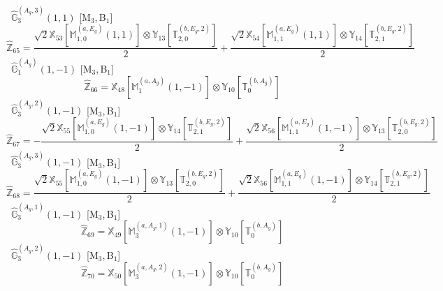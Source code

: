 \documentclass[fleqn,10pt,landscape]{article}
\begin{document}
\begin{itemize}
\begin{dmath*}
\end{dmath*}
\vspace{4mm}
\noindent {} $\,\,\,\hat{\mathbb{G}}_{3}^{(A_{g},3)}(1,1)$ [M$_{3}$,\,B$_{1}$]
\begin{dmath*}
\hat{\mathbb{Z}}_{65}=\frac{\sqrt{2} \mathbb{X}_{53}[\mathbb{M}_{1,0}^{(a,E_{g})}(1,1)] \otimes\mathbb{Y}_{13}[\mathbb{T}_{2,0}^{(b,E_{g},2)}]}{2} + \frac{\sqrt{2} \mathbb{X}_{54}[\mathbb{M}_{1,1}^{(a,E_{g})}(1,1)] \otimes\mathbb{Y}_{14}[\mathbb{T}_{2,1}^{(b,E_{g},2)}]}{2}
\end{dmath*}
\vspace{4mm}
\noindent {} $\,\,\,\hat{\mathbb{G}}_{1}^{(A_{g})}(1,-1)$ [M$_{3}$,\,B$_{1}$]
\begin{dmath*}
\hat{\mathbb{Z}}_{66}=\mathbb{X}_{48}[\mathbb{M}_{1}^{(a,A_{g})}(1,-1)] \otimes\mathbb{Y}_{10}[\mathbb{T}_{0}^{(b,A_{g})}]
\end{dmath*}
\vspace{4mm}
\noindent {} $\,\,\,\hat{\mathbb{G}}_{3}^{(A_{g},2)}(1,-1)$ [M$_{3}$,\,B$_{1}$]
\begin{dmath*}
\hat{\mathbb{Z}}_{67}=- \frac{\sqrt{2} \mathbb{X}_{55}[\mathbb{M}_{1,0}^{(a,E_{g})}(1,-1)] \otimes\mathbb{Y}_{14}[\mathbb{T}_{2,1}^{(b,E_{g},2)}]}{2} + \frac{\sqrt{2} \mathbb{X}_{56}[\mathbb{M}_{1,1}^{(a,E_{g})}(1,-1)] \otimes\mathbb{Y}_{13}[\mathbb{T}_{2,0}^{(b,E_{g},2)}]}{2}
\end{dmath*}
\vspace{4mm}
\noindent {} $\,\,\,\hat{\mathbb{G}}_{3}^{(A_{g},3)}(1,-1)$ [M$_{3}$,\,B$_{1}$]
\begin{dmath*}
\hat{\mathbb{Z}}_{68}=\frac{\sqrt{2} \mathbb{X}_{55}[\mathbb{M}_{1,0}^{(a,E_{g})}(1,-1)] \otimes\mathbb{Y}_{13}[\mathbb{T}_{2,0}^{(b,E_{g},2)}]}{2} + \frac{\sqrt{2} \mathbb{X}_{56}[\mathbb{M}_{1,1}^{(a,E_{g})}(1,-1)] \otimes\mathbb{Y}_{14}[\mathbb{T}_{2,1}^{(b,E_{g},2)}]}{2}
\end{dmath*}
\vspace{4mm}
\noindent {} $\,\,\,\hat{\mathbb{G}}_{3}^{(A_{g},1)}(1,-1)$ [M$_{3}$,\,B$_{1}$]
\begin{dmath*}
\hat{\mathbb{Z}}_{69}=\mathbb{X}_{49}[\mathbb{M}_{3}^{(a,A_{g},1)}(1,-1)] \otimes\mathbb{Y}_{10}[\mathbb{T}_{0}^{(b,A_{g})}]
\end{dmath*}
\vspace{4mm}
\noindent {} $\,\,\,\hat{\mathbb{G}}_{3}^{(A_{g},2)}(1,-1)$ [M$_{3}$,\,B$_{1}$]
\begin{dmath*}
\hat{\mathbb{Z}}_{70}=\mathbb{X}_{50}[\mathbb{M}_{3}^{(a,A_{g},2)}(1,-1)] \otimes\mathbb{Y}_{10}[\mathbb{T}_{0}^{(b,A_{g})}]

\end{dmath*}
\end{itemize}
\end{document}
